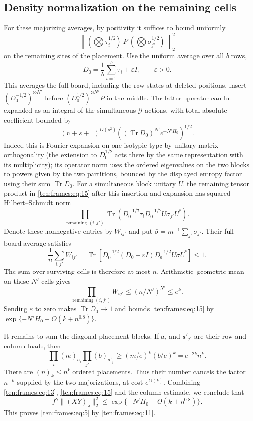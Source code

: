 \subsection{Density normalization on the remaining cells}
\label{ten:frames:part:151}
For these majorizing averages, by positivity it suffices to bound uniformly
\begin{equation}
 \left\|
 (\bigotimes \tau_i^{1/2})\ P\
 (\bigotimes \sigma_{j'}^{1/2})
 \right\|_2^2
 \label{ten:frames:eq:15}
\end{equation}
on the remaining sites of the placement. Use the uniform average over all $b$ rows,
\[
 D_0=\frac1b\sum_{i=1}^b\tau_i+\varepsilon I,\qquad\varepsilon>0.
\]
This averages the full board, including the row states at deleted positions. Insert \((D_0^{-1/2})^{\otimes N'}\) before \((D_0^{1/2})^{\otimes N'} P\) in the middle. The latter operator can be expanded as an integral of the simultaneous \(\mathcal G\) actions, with total absolute coefficient bounded by
\[
 (n+s+1)^{O(s^2)}
 \left((\operatorname{Tr}D_0)^{N'} e^{-N'H_0}\right)^{1/2}.
\]
Indeed this is Fourier expansion on one isotypic type by unitary matrix orthogonality (the extension to \(D_0^{1/2}\) acts there by the same representation with its multiplicity); its operator norm uses the ordered eigenvalues on the two blocks to powers given by the two partitions, bounded by the displayed entropy factor using their sum \(\operatorname{Tr}D_0\). For a simultaneous block unitary \(U\), the remaining tensor product in \eqref{ten:frames:eq:15} after this insertion and expansion has squared Hilbert--Schmidt norm
\[
 \prod_{\text{remaining }(i,j')}
 \operatorname{Tr}(D_0^{-1/2}\tau_i D_0^{-1/2} U \sigma_{j'} U^*) .
\]
Denote these nonnegative entries by $W_{ij'}$ and put $\bar\sigma=m^{-1}\sum_{j'}\sigma_{j'}$. Their full-board average satisfies
\[
 \frac1n\sum_{i,j'}W_{ij'}
 =\operatorname{Tr}\!\left[
 D_0^{-1/2}(D_0-\varepsilon I)D_0^{-1/2}
 U\bar\sigma U^*\right]\le1.
\]
The sum over surviving cells is therefore at most $n$. Arithmetic--geometric mean on those $N'$ cells gives
\[
 \prod_{\text{remaining }(i,j')}W_{ij'}
 \le(n/N')^{N'}\le e^k.
\]
Sending $\varepsilon$ to zero makes $\operatorname{Tr}D_0\to1$ and bounds \eqref{ten:frames:eq:15} by $\exp\{-N'H_0+O(k+n^{0.8})\}$.

It remains to sum the diagonal placement blocks. If $a_i$ and $a'_{j'}$ are their row and column loads, then
\[
 \prod_i(m)_{a_i}\prod_{j'}(b)_{a'_{j'}}
 \ge(m/e)^k(b/e)^k=e^{-2k}n^k.
\]
There are $(n)_k\le n^k$ ordered placements. Thus their number cancels the factor $n^{-k}$ supplied by the two majorizations, at cost $e^{O(k)}$. Combining \eqref{ten:frames:eq:13}, \eqref{ten:frames:eq:15} and the column estimate, we conclude that
\[
 f^\gamma\|(XY)_\lambda\|_2^2 \le \exp\{-N'H_0+O(k+n^{0.8})\}.
\]
This proves \eqref{ten:frames:eq:5} by \eqref{ten:frames:eq:11}.

